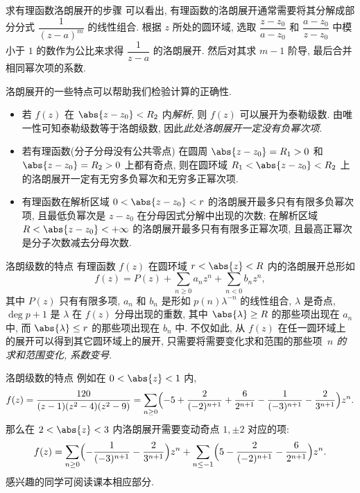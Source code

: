 \begin{frame}{求有理函数洛朗展开的步骤}
	\onslide<+->
	可以看出, 有理函数的洛朗展开通常需要将其分解成部分分式 $\dfrac1{(z-a)^m}$ 的线性组合.
	\onslide<+->
	根据 $z$ 所处的圆环域, 选取 $\dfrac{z-z_0}{a-z_0}$ 和 $\dfrac{a-z_0}{z-z_0}$ 中模小于 $1$ 的数作为公比来求得 $\dfrac1{z-a}$ 的洛朗展开.
	\onslide<+->
	然后对其求 $m-1$ 阶导, 最后合并相同幂次项的系数.

	\onslide<+->
	洛朗展开的一些特点可以帮助我们检验计算的正确性.
	\begin{itemize}
		\item 若 $f(z)$ 在 $\abs{z-z_0}<R_2$ 内\emph{解析},
		\onslide<+->
		则 $f(z)$ 可以展开为泰勒级数.
		\onslide<+->
		由唯一性可知泰勒级数等于洛朗级数,
		\onslide<+->
		因此\emph{此处洛朗展开一定没有负幂次项}.
		\item 若有理函数(分子分母没有公共零点) 在圆周 $\abs{z-z_0}=R_1>0$ 和 $\abs{z-z_0}=R_2>0$ 上都有奇点, 
		\onslide<+->
		则在圆环域 $R_1<\abs{z-z_0}<R_2$ 上的洛朗展开一定有无穷多负幂次和无穷多正幂次项.
		\item 有理函数在解析区域 $0<\abs{z-z_0}<r$ 的洛朗展开最多只有有限多负幂次项, 且最低负幂次是 $z-z_0$ 在分母因式分解中出现的次数; 
		\onslide<+->
		在解析区域 $R<\abs{z-z_0}<+\infty$ 的洛朗展开最多只有有限多正幂次项, 且最高正幂次是分子次数减去分母次数.
	\end{itemize}
\end{frame}


\begin{frame}{洛朗级数的特点\noexer}
	\onslide<+->
	有理函数 $f(z)$ 在圆环域 $r<\abs{z}<R$ 内的洛朗展开总形如
	\[
		f(z)=P(z)+\sum_{n\ge 0}a_n z^n+\sum_{n<0}b_n z^n,
	\]
	其中 $P(z)$ 只有有限多项, 
	\onslide<+->
	$a_n$ 和 $b_n$ 是形如 $p(n)\lambda^{-n}$ 的线性组合, $\lambda$ 是奇点, $\deg p+1$ 是 $\lambda$ 在 $f(z)$ 分母出现的重数,
	\onslide<+->
	其中 $\abs{\lambda}\ge R$ 的那些项出现在 $a_n$ 中, 而 $\abs{\lambda}\le r$ 的那些项出现在 $b_n$ 中.
	\onslide<+->
	不仅如此, 从 $f(z)$ 在任一圆环域上的展开可以得到其它圆环域上的展开,
	\onslide<+->
	只需要将需要变化求和范围的那些项{\itshape\ $n$ 的求和范围变化, 系数变号}.
\end{frame}


\begin{frame}{洛朗级数的特点\noexer}
	\onslide<+->
	例如在 $0<\abs{z}<1$ 内,
	\[
		f(z)=\frac{120}{(z-1)(z^2-4)(z^2-9)}=\sum_{n\ge 0}\Bigl(-5+\frac2{(-2)^{n+1}}+\frac6{2^{n+1}}-\frac1{(-3)^{n+1}}-\frac2{3^{n+1}}\Bigr)z^n.
	\]
	\onslide<+->
	那么在 $2<\abs{z}<3$ 内洛朗展开需要变动奇点 $1,\pm2$ 对应的项:
	\[
		f(z)=\sum_{n\ge 0}\Bigl(-\frac1{(-3)^{n+1}}-\frac2{3^{n+1}}\Bigr)z^n+\sum_{n\le-1}\Bigl(5-\frac2{(-2)^{n+1}}-\frac6{2^{n+1}}\Bigr)z^n.
	\]
	\onslide<+->
	感兴趣的同学可阅读课本相应部分.
\end{frame}


